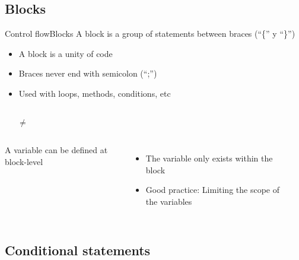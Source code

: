 \documentclass[10pt,compress]{beamer} %
\begin{document}
\subsection{Blocks}

\begin{frame}{Control flow}{Blocks}
	\vspace{-0.2cm}
	A block is a group of statements between braces (``\{'' y ``\}'')
	    \begin{itemize}
		\item A block is a unity of code
		\item Braces never end with semicolon (``;'')
		\item Used with loops, methods, conditions, etc
	    \end{itemize}

	\vspace{-0.2cm}
    \begin{columns}
	\footnotesize{
		\begin{block}{}
		
		\end{block}
	}
		\alert{\Large{$\ne$}}
	\footnotesize{
		\begin{block}{}
		
		\end{block}
	}
	\end{columns}
	
	\vspace{-0.2cm}
    \begin{columns}
		 A variable can be defined at block-level
			\begin{itemize}
			\item The variable only exists within the block
			\item Good practice: Limiting the scope of the variables
	    	\end{itemize}
		\begin{block}{}
		
		\end{block}
	\end{columns}

\end{frame}

\subsection{Conditional statements}
\end{document}
